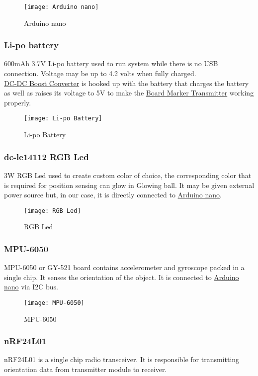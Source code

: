 \begin{figure}[h]
  \centering
  \texttt{[image: Arduino nano]}
  \caption{Arduino nano}
\end{figure}


\subsubsection{Li-po battery}
600mAh 3.7V Li-po battery used to run system while there is no USB connection. Voltage may be up to 4.2 volts when fully charged. \\
\underline{DC-DC Boost Converter} is hooked up with the battery that charges the battery as well as raises its voltage to 5V to make the \underline{Board Marker Transmitter} working properly.
\newpage
\begin{figure}[h]
  \centering
  \texttt{[image: Li-po Battery]}
  \caption{Li-po Battery}
\end{figure}


\subsubsection{dc-le14112 RGB Led}
3W RGB Led used to create custom color of choice, the corresponding color that is required for position sensing can glow in Glowing ball. It may be given external power source but, in our case, it is directly connected to \underline{Arduino nano}.

\begin{figure}[h]
  \centering
  \texttt{[image: RGB Led]}
  \caption{RGB Led}
\end{figure}


\subsubsection{MPU-6050}
MPU-6050 or GY-521 board contains accelerometer and gyroscope packed in a single chip. It senses the orientation of the object. It is connected to \underline{Arduino nano} via I2C bus.
\newpage
\begin{figure}[h]
  \centering
  \texttt{[image: MPU-6050]}
  \caption{MPU-6050}
\end{figure}


\subsubsection{nRF24L01}
nRF24L01 is a single chip radio transceiver. It is responsible for transmitting orientation data from transmitter module to receiver.

